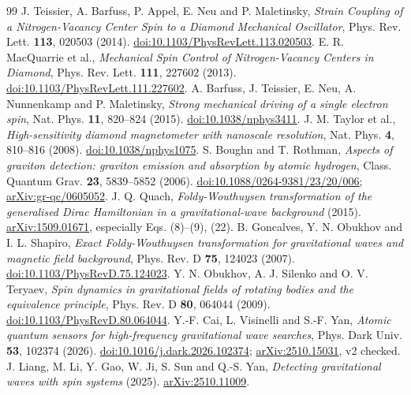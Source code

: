 \documentclass[a4paper,11pt]{article}
\begin{document}
\begin{thebibliography}{99}
 J. Teissier, A. Barfuss, P. Appel, E. Neu and P. Maletinsky, \emph{Strain Coupling of a Nitrogen-Vacancy Center Spin to a Diamond Mechanical Oscillator}, Phys. Rev. Lett. \textbf{113}, 020503 (2014). \href{https://doi.org/10.1103/PhysRevLett.113.020503}{doi:10.1103/PhysRevLett.113.020503}.
 E. R. MacQuarrie et al., \emph{Mechanical Spin Control of Nitrogen-Vacancy Centers in Diamond}, Phys. Rev. Lett. \textbf{111}, 227602 (2013). \href{https://doi.org/10.1103/PhysRevLett.111.227602}{doi:10.1103/PhysRevLett.111.227602}.
 A. Barfuss, J. Teissier, E. Neu, A. Nunnenkamp and P. Maletinsky, \emph{Strong mechanical driving of a single electron spin}, Nat. Phys. \textbf{11}, 820--824 (2015). \href{https://doi.org/10.1038/nphys3411}{doi:10.1038/nphys3411}.
 J. M. Taylor et al., \emph{High-sensitivity diamond magnetometer with nanoscale resolution}, Nat. Phys. \textbf{4}, 810--816 (2008). \href{https://doi.org/10.1038/nphys1075}{doi:10.1038/nphys1075}.
 S. Boughn and T. Rothman, \emph{Aspects of graviton detection: graviton emission and absorption by atomic hydrogen}, Class. Quantum Grav. \textbf{23}, 5839--5852 (2006). \href{https://doi.org/10.1088/0264-9381/23/20/006}{doi:10.1088/0264-9381/23/20/006}; \href{https://arxiv.org/abs/gr-qc/0605052}{arXiv:gr-qc/0605052}.
 J. Q. Quach, \emph{Foldy-Wouthuysen transformation of the generalised Dirac Hamiltonian in a gravitational-wave background} (2015). \href{https://arxiv.org/abs/1509.01671}{arXiv:1509.01671}, especially Eqs. (8)--(9), (22).
 B. Goncalves, Y. N. Obukhov and I. L. Shapiro, \emph{Exact Foldy-Wouthuysen transformation for gravitational waves and magnetic field background}, Phys. Rev. D \textbf{75}, 124023 (2007). \href{https://doi.org/10.1103/PhysRevD.75.124023}{doi:10.1103/PhysRevD.75.124023}.
 Y. N. Obukhov, A. J. Silenko and O. V. Teryaev, \emph{Spin dynamics in gravitational fields of rotating bodies and the equivalence principle}, Phys. Rev. D \textbf{80}, 064044 (2009). \href{https://doi.org/10.1103/PhysRevD.80.064044}{doi:10.1103/PhysRevD.80.064044}.
 Y.-F. Cai, L. Visinelli and S.-F. Yan, \emph{Atomic quantum sensors for high-frequency gravitational wave searches}, Phys. Dark Univ. \textbf{53}, 102374 (2026). \href{https://doi.org/10.1016/j.dark.2026.102374}{doi:10.1016/j.dark.2026.102374}; \href{https://arxiv.org/abs/2510.15031}{arXiv:2510.15031}, v2 checked.
 J. Liang, M. Li, Y. Gao, W. Ji, S. Sun and Q.-S. Yan, \emph{Detecting gravitational waves with spin systems} (2025). \href{https://arxiv.org/abs/2510.11009}{arXiv:2510.11009}.

\end{thebibliography}
\end{document}
